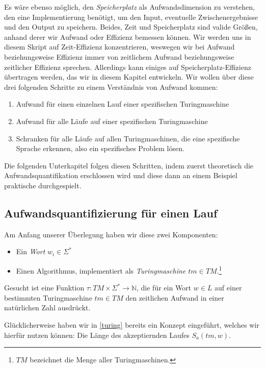 Es wäre ebenso möglich,
den \emph{Speicherplatz} als Aufwandsdimension zu verstehen,
den eine Implementierung benötigt,
um den Input,
eventuelle Zwischenergebnisse
und den Output zu speichern.
Beides, Zeit und Speicherplatz sind valide Größen,
anhand derer wir Aufwand oder Effizienz bemessen können.
Wir werden uns in diesem Skript auf Zeit-Effizienz konzentrieren,
weswegen wir bei Aufwand beziehungsweise Effizienz immer von
zeitlichem Aufwand beziehungsweise zeitlicher Effizienz sprechen.
Allerdings kann einiges auf Speicherplatz-Effizienz übertragen werden,
das wir in diesem Kapitel entwickeln.
Wir wollen über diese drei folgenden Schritte zu einem Verständnis von Aufwand kommen:
\begin{enumerate}
    \item Aufwand für einen einzelnen Lauf einer spezifischen Turingmaschine
    \item Aufwand für alle Läufe auf einer spezifischen Turingmaschine
    \item Schranken für alle Läufe auf allen Turingmaschinen,
        die eine spezifische Sprache erkennen, also ein spezifisches Problem lösen.
\end{enumerate}

Die folgenden Unterkapitel folgen diesen Schritten,
indem zuerst theoretisch die Aufwandsquantifikation erschlossen wird
und diese dann an einem Beispiel praktische durchgespielt.

\subsection{Aufwandsquantifizierung für einen Lauf}
Am Anfang unserer Überlegung haben wir diese zwei Komponenten:
\begin{itemize}
    \item Ein \emph{Wort} $w_i \in \Sigma^*$
    \item Einen Algorithmus,
        implementiert als \emph{Turingmaschine $tm \in TM$}.\footnote{%
            $TM$ bezeichnet die Menge aller Turingmaschinen.}
\end{itemize}
Gesucht ist eine Funktion $\tau: TM \times \Sigma^* \rightarrow \mathbb{N}$,
die für ein Wort $w \in L$ auf einer bestimmten Turingmaschine $tm \in TM$
den zeitlichen Aufwand in einer natürlichen Zahl ausdrückt.

Glücklicherweise haben wir in \autoref{turing} bereits ein Konzept eingeführt,
welches wir hierfür nutzen können:
Die Länge des akzeptiernden Laufes $S_a(tm, w)$.


